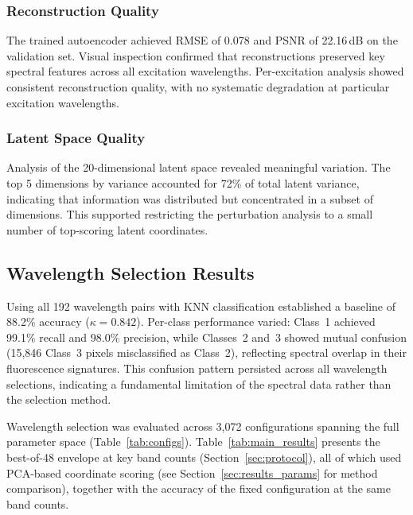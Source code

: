 \subsubsection{Reconstruction Quality}
The trained autoencoder achieved RMSE of 0.078 and PSNR of 22.16\,dB on the validation set.
Visual inspection confirmed that reconstructions preserved key spectral features across all excitation wavelengths.
Per-excitation analysis showed consistent reconstruction quality, with no systematic degradation at particular excitation wavelengths.

\subsubsection{Latent Space Quality}
Analysis of the 20-dimensional latent space revealed meaningful variation.
The top 5 dimensions by variance accounted for 72\% of total latent variance, indicating that information was distributed but concentrated in a subset of dimensions.
This supported restricting the perturbation analysis to a small number of top-scoring latent coordinates.

\subsection{Wavelength Selection Results}
\label{sec:results_selection}

Using all 192 wavelength pairs with KNN classification established a baseline of 88.2\% accuracy ($\kappa = 0.842$).
Per-class performance varied: Class~1 achieved 99.1\% recall and 98.0\% precision, while Classes~2 and~3 showed mutual confusion (15,846 Class~3 pixels misclassified as Class~2), reflecting spectral overlap in their fluorescence signatures.
This confusion pattern persisted across all wavelength selections, indicating a fundamental limitation of the spectral data rather than the selection method.

Wavelength selection was evaluated across 3,072 configurations spanning the full parameter space (Table~\ref{tab:configs}).
Table~\ref{tab:main_results} presents the best-of-48 envelope at key band counts (Section~\ref{sec:protocol}), all of which used PCA-based coordinate scoring (see Section~\ref{sec:results_params} for method comparison), together with the accuracy of the fixed configuration at the same band counts.

